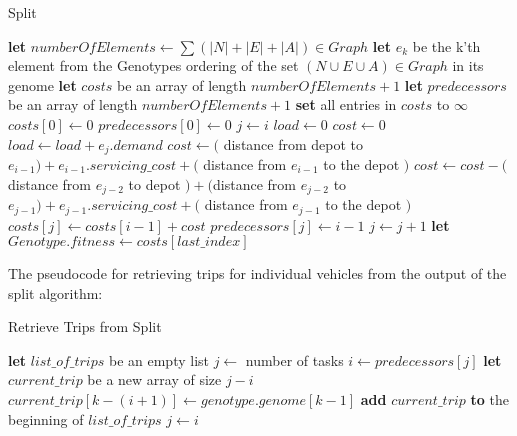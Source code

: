\begin{algorithm}[thbp]
\caption{Split}\label{split-pseudocode}
\begin{algorithmic}[1]

	\State \textbf{let} $numberOfElements \leftarrow \sum (|N|+|E|+|A|) \in Graph$
	\State \textbf{let} $e_k$ be the k'th element from the Genotypes ordering of the set $(N \cup E \cup A) \in Graph$ in its genome
	\State \textbf{let} $costs$ be an array of length $numberOfElements + 1$
	\State \textbf{let} $predecessors$ be an array of length $numberOfElements + 1$
	\State \textbf{set} all entries in $costs$ to $\infty$
	\State $costs[0] \leftarrow 0$
	\State $predecessors[0] \leftarrow 0$
	\Statex
		\State $j \leftarrow i$
		\State $load \leftarrow 0$
		\State $cost \leftarrow 0$
		\DoWhile
			\State $load \leftarrow load + e_j.demand$
			\Statex
				\State $cost \leftarrow($ distance from depot to $e_{i-1}) + e_{i-1}.servicing\_cost +($ distance from $e_{i-1}$ to the depot $)$
			\Else
				\State $cost \leftarrow  cost - ($ distance from $e_{j-2}$ to depot $) + ($distance from $e_{j-2}$ to $e_{j-1}) + e_{j-1}.servicing\_cost +($ distance from $e_{j-1}$ to the depot $)$
			\EndIf
			\Statex
				\State $costs[j] \leftarrow costs[i - 1] + cost$
				\State $predecessors[j] \leftarrow i - 1$
			\EndIf
			\Statex
			\State $j \leftarrow j + 1$
	\EndFor
	\Statex
	\State \textbf{let} $Genotype.fitness \leftarrow costs[last\_index]$
\EndProcedure

\end{algorithmic}
\end{algorithm}

The pseudocode for retrieving trips for individual vehicles from the output of the split algorithm:

\begin{algorithm}[thbp]
\caption{Retrieve Trips from Split}\label{split-retrieve-pseudocode}
\begin{algorithmic}[1]

	\State \textbf{let} $list\_of\_trips$ be an empty list
	\State $j \leftarrow$ number of tasks
	\DoWhile
		\State $i \leftarrow predecessors[j]$
		\State \textbf{let} $current\_trip$ be a new array of size $j - i$
			\State $current\_trip[k-(i+1)] \leftarrow genotype.genome[k-1]$
		\EndFor
		\State \textbf{add} $current\_trip$ \textbf{to} the beginning of $list\_of\_trips$
		\State $j \leftarrow i$
\EndProcedure

\end{algorithmic}
\end{algorithm}

